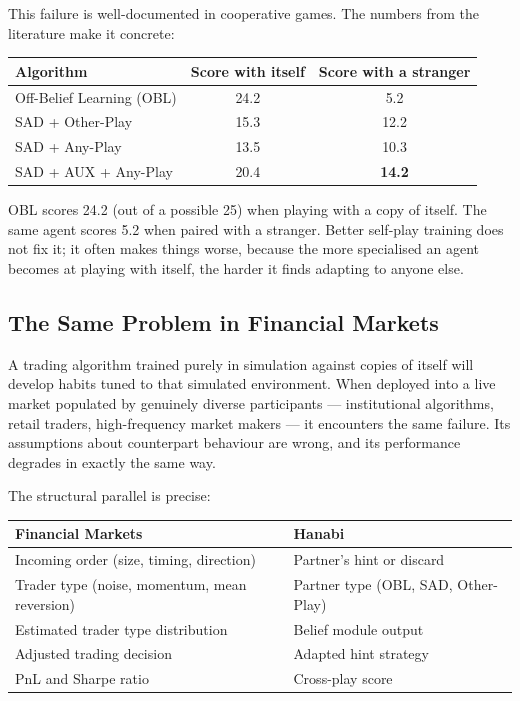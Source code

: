 \documentclass[11pt, a4paper]{article}
\begin{document}
This failure is well-documented in cooperative games. The numbers from the literature make it concrete:

\vspace{8pt}
\begin{center}
\begin{tabular}{lcc}
\toprule
\textbf{Algorithm} & \textbf{Score with itself} & \textbf{Score with a stranger} \\
\midrule
Off-Belief Learning (OBL) & 24.2 & 5.2 \\
SAD + Other-Play          & 15.3 & 12.2 \\
SAD + Any-Play            & 13.5 & 10.3 \\
SAD + AUX + Any-Play      & 20.4 & \textbf{14.2} \\
\bottomrule
\end{tabular}
\end{center}
\vspace{8pt}

OBL scores 24.2 (out of a possible 25) when playing with a copy of itself. The same agent scores 5.2 when paired with a stranger. Better self-play training does not fix it; it often makes things worse, because the more specialised an agent becomes at playing with itself, the harder it finds adapting to anyone else.

\subsection{The Same Problem in Financial Markets}

A trading algorithm trained purely in simulation against copies of itself will develop habits tuned to that simulated environment. When deployed into a live market populated by genuinely diverse participants --- institutional algorithms, retail traders, high-frequency market makers --- it encounters the same failure. Its assumptions about counterpart behaviour are wrong, and its performance degrades in exactly the same way.

The structural parallel is precise:

\vspace{8pt}
\begin{center}
\begin{tabular}{p{5.5cm} p{5.5cm}}
\toprule
\textbf{Financial Markets} & \textbf{Hanabi} \\
\midrule
Incoming order (size, timing, direction) & Partner's hint or discard \\
Trader type (noise, momentum, mean reversion) & Partner type (OBL, SAD, Other-Play) \\
Estimated trader type distribution & Belief module output \\
Adjusted trading decision & Adapted hint strategy \\
PnL and Sharpe ratio & Cross-play score \\
\bottomrule
\end{tabular}
\end{center}
\vspace{8pt}
\end{document}
